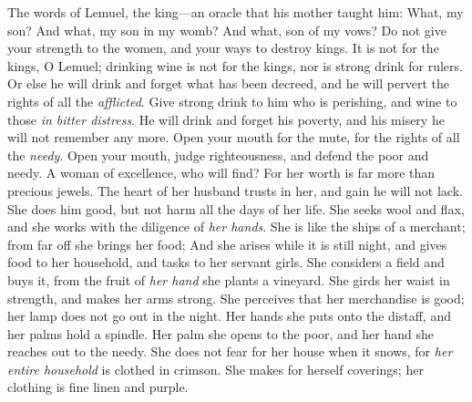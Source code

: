 \begin{biblechapter} %
 The words of Lemuel, the king—an oracle 
that his mother taught him:
\verse What, my son? And what, my son in my womb? 
And what, son of my vows?
\verse Do not give your strength to the women, 
and your ways to destroy kings.
\verse It is not for the kings, O Lemuel; 
drinking wine is not for the kings, 
nor is strong drink for rulers.
\verse Or else he will drink and forget what has been decreed, 
and he will pervert the rights of all the \textit{afflicted}.
\verse Give strong drink to him who is perishing, 
and wine to those \textit{in bitter distress}.
\verse He will drink and forget his poverty, 
and his misery he will not remember any more.
\verse Open your mouth for the mute, 
for the rights of all the \textit{needy}.
\verse Open your mouth, judge righteousness, 
and defend the poor and needy.
 A woman of excellence, who will find? 
For her worth is far more than precious jewels.
\verse The heart of her husband trusts in her, 
and gain he will not lack.
\verse She does him good, but not harm 
all the days of her life.
\verse She seeks wool and flax, 
and she works with the diligence of \textit{her hands}.
\verse She is like the ships of a merchant; 
from far off she brings her food;
\verse And she arises while it is still night, 
and gives food to her household, 
and tasks to her servant girls.
\verse She considers a field and buys it, 
from the fruit of \textit{her hand} she plants a vineyard.
\verse She girds her waist in strength, 
and makes her arms strong.
\verse She perceives that her merchandise is good; 
her lamp does not go out in the night.
\verse Her hands she puts onto the distaff, 
and her palms hold a spindle.
\verse Her palm she opens to the poor, 
and her hand she reaches out to the needy.
\verse She does not fear for her house when it snows, 
for \textit{her entire household} is clothed in crimson.
\verse She makes for herself coverings; 
her clothing is fine linen and purple.

\end{biblechapter}
